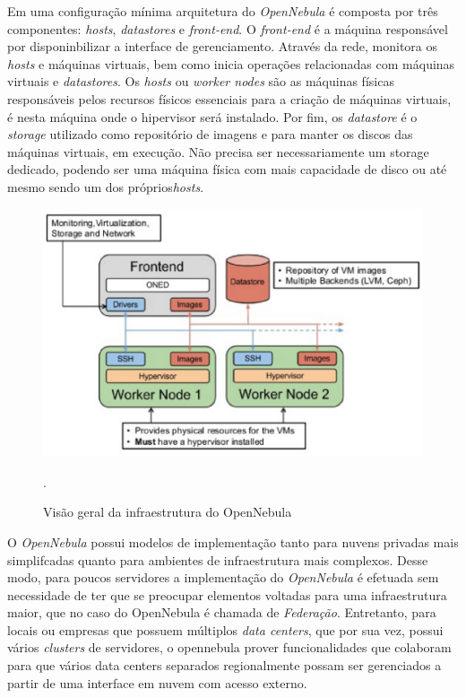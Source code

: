 Em uma configuração mínima  arquitetura do \textit{OpenNebula} é composta por três componentes: \textit{hosts}, \textit{datastores} e \textit{front-end}. O \textit{front-end} é a máquina responsável por disponinbilizar a interface de gerenciamento. Através da rede, monitora os \textit{hosts} e máquinas virtuais, bem como inicia operações relacionadas com máquinas virtuais e \textit{datastores}. Os \textit{hosts} ou \textit{worker nodes} são as máquinas físicas responsáveis pelos recursos físicos essenciais para a criação de máquinas virtuais, é nesta máquina onde o hipervisor será instalado. Por fim, os \textit{datastore} é o \textit{storage} utilizado como repositório de imagens e para manter os discos das máquinas virtuais, em execução. Não precisa ser necessariamente um storage dedicado, podendo ser uma máquina física com mais capacidade de disco ou até mesmo sendo um dos próprios\textit{hosts}.  


\begin{figure}[!htb]
\centering
\includegraphics [keepaspectratio=true,scale=0.60]{figuras/opennebula_instalation.eps}
\caption{Visão geral da infraestrutura do OpenNebula}
\cite{opennebula}.
\label{diagramaopennebula}
\end{figure}



O \textit{OpenNebula} possui modelos de implementação tanto para nuvens privadas mais simplifcadas quanto para ambientes de infraestrutura mais complexos. Desse modo, para poucos servidores a implementação do \textit{OpenNebula} é efetuada sem necessidade de ter que se preocupar elementos voltadas para uma infraestrutura maior, que no caso do OpenNebula é chamada de \textit{Federação}. Entretanto, para locais ou empresas que possuem múltiplos \textit{data centers}, que por sua vez, possui vários \textit{clusters} de servidores, o opennebula prover funcionalidades que colaboram para que vários data centers separados regionalmente possam ser gerenciados a partir de uma interface em nuvem com acesso externo. 

